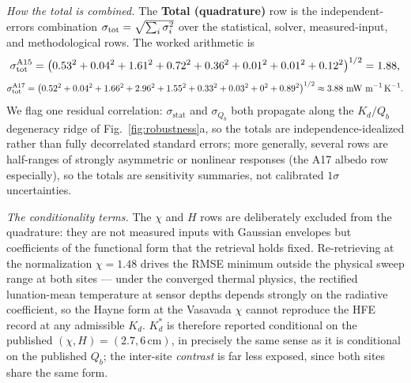 \documentclass[11pt]{article}
\begin{document}
\emph{How the total is combined.} The \textbf{Total (quadrature)} row is
the independent-errors combination $\sigma_{\rm tot}=\sqrt{\sum_i
\sigma_i^2}$ over the statistical, solver, measured-input, and
methodological rows. The worked arithmetic is
\begin{equation*}
\sigma_{\rm tot}^{\rm A15} =
\big(0.53^{2}+0.04^{2}+1.61^{2}+0.72^{2}+0.36^{2}+0.01^{2}+0.01^{2}+0.12^{2}\big)^{1/2}
= 1.88,
\end{equation*}
\begin{equation*}
\sigma_{\rm tot}^{\rm A17} =
\big(0.52^{2}+0.04^{2}+1.66^{2}+2.96^{2}+1.55^{2}+0.33^{2}+0.03^{2}+0^{2}+0.89^{2}\big)^{1/2}
\approx 3.88~\text{mW m}^{-1}\,\text{K}^{-1}.
\end{equation*}
We flag one residual correlation: $\sigma_\mathrm{stat}$ and $\sigma_{Q_b}$
both propagate along the $K_d/Q_b$ degeneracy ridge of
Fig.~\ref{fig:robustness}a, so the totals are independence-idealized
rather than fully decorrelated standard errors; more generally,
several rows are half-ranges of strongly asymmetric or nonlinear
responses (the A17 albedo row especially), so the totals are sensitivity
summaries, not calibrated $1\sigma$ uncertainties.

\emph{The conditionality terms.} The $\chi$ and $H$ rows are deliberately
excluded from the quadrature: they are not measured inputs with Gaussian
envelopes but coefficients of the \citet{hayne2017} functional form that
the retrieval holds fixed. Re-retrieving at the \citet{vasavada2012}
normalization $\chi=1.48$ drives the RMSE minimum outside the physical
sweep range at both sites --- under the converged thermal physics, the
rectified lunation-mean temperature at sensor depths depends strongly on the
radiative coefficient, so the Hayne form at the Vasavada $\chi$ cannot
reproduce the HFE record at any admissible $K_d$. $K_d^{*}$ is therefore
reported conditional on the published $(\chi, H)=(2.7, 6\,\mathrm{cm})$,
in precisely the same sense as it is conditional on the published $Q_b$;
the inter-site \emph{contrast} is far less exposed, since both sites share
the same form.
\end{document}

